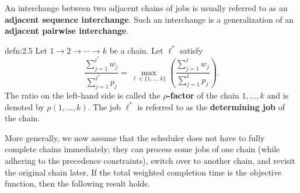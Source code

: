 An interchange between two adjacent chains of jobs is usually referred to as
an {\bf adjacent sequence interchange}. Such an interchange is a generalization of
an {\bf adjacent pairwise interchange}.

\begin{defn}{defn:2.5}
    Let $1 \to 2 \to \cdots \to k$ be a chain. Let $\ell^*$ satisfy 
    \[ \frac{\sum_{j=1}^{\ell^*} w_j}{\sum_{j=1}^{\ell^*} p_j} 
    = \max_{\ell\in\{1, \dots, k\}} \left( \frac{\sum_{j=1}^\ell w_j}
    {\sum_{j=1}^\ell p_j} \right). \] 
    The ratio on the left-hand side is called the {\bf $\rho$-factor} 
    of the chain $1, \dots, k$ and is denoted by $\rho(1, \dots, k)$. 
    The job $\ell^*$ is referred to as the {\bf determining job} of the chain.
\end{defn}

More generally, we now assume that the scheduler does not have to fully 
complete chains immediately; they can process some jobs of one chain 
(while adhering to the precedence constraints), switch over to another 
chain, and revisit the original chain later. If the total weighted 
completion time is the objective function, then the following result holds. 

